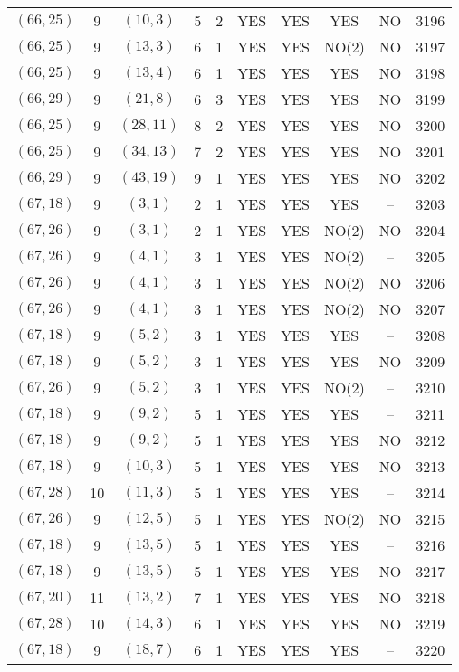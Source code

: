 \begin{longtable}{|c|c|c|c|c|c|c|c|c|c|}
$(66, 25)$ & 9 & $(10, 3)$ & 5 & 2 & YES & YES & YES & NO & 3196\\
$(66, 25)$ & 9 & $(13, 3)$ & 6 & 1 & YES & YES & NO(2) & NO & 3197\\
$(66, 25)$ & 9 & $(13, 4)$ & 6 & 1 & YES & YES & YES & NO & 3198\\
$(66, 29)$ & 9 & $(21, 8)$ & 6 & 3 & YES & YES & YES & NO & 3199\\
$(66, 25)$ & 9 & $(28, 11)$ & 8 & 2 & YES & YES & YES & NO & 3200\\
$(66, 25)$ & 9 & $(34, 13)$ & 7 & 2 & YES & YES & YES & NO & 3201\\
$(66, 29)$ & 9 & $(43, 19)$ & 9 & 1 & YES & YES & YES & NO & 3202\\
$(67, 18)$ & 9 & $(3, 1)$ & 2 & 1 & YES & YES & YES & -- & 3203\\
$(67, 26)$ & 9 & $(3, 1)$ & 2 & 1 & YES & YES & NO(2) & NO & 3204\\
$(67, 26)$ & 9 & $(4, 1)$ & 3 & 1 & YES & YES & NO(2) & -- & 3205\\
$(67, 26)$ & 9 & $(4, 1)$ & 3 & 1 & YES & YES & NO(2) & NO & 3206\\
$(67, 26)$ & 9 & $(4, 1)$ & 3 & 1 & YES & YES & NO(2) & NO & 3207\\
$(67, 18)$ & 9 & $(5, 2)$ & 3 & 1 & YES & YES & YES & -- & 3208\\
$(67, 18)$ & 9 & $(5, 2)$ & 3 & 1 & YES & YES & YES & NO & 3209\\
$(67, 26)$ & 9 & $(5, 2)$ & 3 & 1 & YES & YES & NO(2) & -- & 3210\\
$(67, 18)$ & 9 & $(9, 2)$ & 5 & 1 & YES & YES & YES & -- & 3211\\
$(67, 18)$ & 9 & $(9, 2)$ & 5 & 1 & YES & YES & YES & NO & 3212\\
$(67, 18)$ & 9 & $(10, 3)$ & 5 & 1 & YES & YES & YES & NO & 3213\\
$(67, 28)$ & 10 & $(11, 3)$ & 5 & 1 & YES & YES & YES & -- & 3214\\
$(67, 26)$ & 9 & $(12, 5)$ & 5 & 1 & YES & YES & NO(2) & NO & 3215\\
$(67, 18)$ & 9 & $(13, 5)$ & 5 & 1 & YES & YES & YES & -- & 3216\\
$(67, 18)$ & 9 & $(13, 5)$ & 5 & 1 & YES & YES & YES & NO & 3217\\
$(67, 20)$ & 11 & $(13, 2)$ & 7 & 1 & YES & YES & YES & NO & 3218\\
$(67, 28)$ & 10 & $(14, 3)$ & 6 & 1 & YES & YES & YES & NO & 3219\\
$(67, 18)$ & 9 & $(18, 7)$ & 6 & 1 & YES & YES & YES & -- & 3220\\

\end{longtable}
